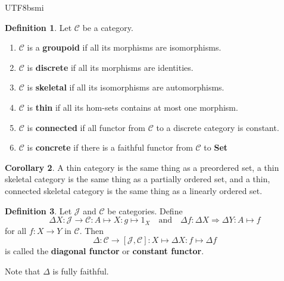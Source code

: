 \documentclass[12pt]{article}
\theoremstyle{definition}
\newtheorem{definition}{Definition}[section]
\newtheorem{corollary}[definition]{Corollary}
\newcommand\<{\langle}
\renewcommand\>{\rangle}
\begin{document}
\begin{CJK}{UTF8}{bsmi}
\begin{definition}
    Let $\mathcal{C}$ be a category.
    \begin{enumerate}
        \item $\mathcal{C}$ is a \textbf{groupoid} if all its morphisms are isomorphisms.
        \item $\mathcal{C}$ is \textbf{discrete} if all its morphisms are identities.
        \item $\mathcal{C}$ is \textbf{skeletal} if all its isomorphisms are automorphisms.
        \item $\mathcal{C}$ is \textbf{thin} if all its hom-sets contains at most one morphism.
        \item $\mathcal{C}$ is \textbf{connected} if all functor from $\mathcal{C}$ to a discrete category is constant.
        \item $\mathcal{C}$ is \textbf{concrete} if there is a faithful functor from $\mathcal{C}$ to \textbf{Set}
    \end{enumerate}
\end{definition}

\begin{corollary}
    A thin category is the same thing as a preordered set, a thin skeletal category is the same thing as a partially ordered set, and a thin, connected skeletal category is the same thing as a linearly ordered set.
\end{corollary}

\begin{definition}
    Let $\mathcal{J}$ and $\mathcal{C}$ be categories.
    Define 
    \[
        \Delta X:\mathcal{J}\to\mathcal{C}:A\mapsto X:g\mapsto 1_X
        \quad\text{and}\quad
        \Delta f:\Delta X\Rightarrow\Delta Y:A\mapsto f
    \]
    for all $f:X\to Y$ in $\mathcal{C}$.
    Then
    \[
        \Delta:
        \mathcal{C}\to[\mathcal{J}, \mathcal{C}]:
        X\mapsto \Delta X:
        f\mapsto \Delta f
    \]
    is called the \textbf{diagonal functor} or \textbf{constant functor}.
\end{definition}

Note that $\Delta$ is fully faithful.


\end{CJK}
\end{document}
